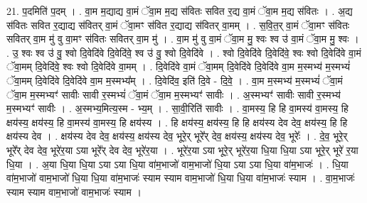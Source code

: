 \documentclass[17pt]{extarticle}
\begin{document}
21. प॒दमिति॑ प॒दम् । . वा॒म म॒द्याद्य वा॒मं ॅवा॒म म॒द्य स॑वितः सवित र॒द्य वा॒मं ॅवा॒म म॒द्य स॑वितः । . अ॒द्य स॑वितः सवित र॒द्याद्य स॑वितर् वा॒मं ॅवा॒मꣳ स॑वित र॒द्याद्य स॑वितर् वा॒मम् । . स॒वि॒त॒र् वा॒मं ॅवा॒मꣳ स॑वितः सवितर् वा॒म मु॑ वु वा॒मꣳ स॑वितः सवितर् वा॒म मु॑ । . वा॒म मु॑ वु वा॒मं ॅवा॒म मु॒ श्वः श्व उ॑ वा॒मं ॅवा॒म मु॒ श्वः । . उ॒ श्वः श्व उ॑ वु॒ श्वो दि॒वेदि॑वे दि॒वेदि॑वे॒ श्व उ॑ वु॒ श्वो दि॒वेदि॑वे । . श्वो दि॒वेदि॑वे दि॒वेदि॑वे॒ श्वः श्वो दि॒वेदि॑वे वा॒मं ॅवा॒मम् दि॒वेदि॑वे॒ श्वः श्वो दि॒वेदि॑वे वा॒मम् । . दि॒वेदि॑वे वा॒मं ॅवा॒मम् दि॒वेदि॑वे दि॒वेदि॑वे वा॒म म॒स्मभ्य॑ म॒स्मभ्यं॑ ॅवा॒मम् दि॒वेदि॑वे दि॒वेदि॑वे वा॒म म॒स्मभ्य᳚म् । . दि॒वेदि॑व॒ इति॑ दि॒वे - दि॒वे॒ । . वा॒म म॒स्मभ्य॑ म॒स्मभ्यं॑ ॅवा॒मं ॅवा॒म म॒स्मभ्यꣳ॑ सावीः सावी र॒स्मभ्यं॑ ॅवा॒मं ॅवा॒म म॒स्मभ्यꣳ॑ सावीः । . अ॒स्मभ्यꣳ॑ सावीः सावी र॒स्मभ्य॑ म॒स्मभ्यꣳ॑ सावीः । . अ॒स्मभ्य॒मित्य॒स्म - भ्य॒म् । . सा॒वी॒रिति॑ सावीः । . वा॒मस्य॒ हि हि वा॒मस्य॑ वा॒मस्य॒ हि क्षय॑स्य॒ क्षय॑स्य॒ हि वा॒मस्य॑ वा॒मस्य॒ हि क्षय॑स्य । . हि क्षय॑स्य॒ क्षय॑स्य॒ हि हि क्षय॑स्य देव देव॒ क्षय॑स्य॒ हि हि क्षय॑स्य देव । . क्षय॑स्य देव देव॒ क्षय॑स्य॒ क्षय॑स्य देव॒ भूरे॒र् भूरे᳚र् देव॒ क्षय॑स्य॒ क्षय॑स्य देव॒ भूरेः᳚ । . दे॒व॒ भूरे॒र् भूरे᳚र् देव देव॒ भूरे॑र॒या ऽया भूरे᳚र् देव देव॒ भूरे॑र॒या । . भूरे॑र॒या ऽया भूरे॒र् भूरे॑र॒या धि॒या धि॒या ऽया भूरे॒र् भूरे॑ र॒या धि॒या । . अ॒या धि॒या धि॒या ऽया ऽया धि॒या वा॑म॒भाजो॑ वाम॒भाजो॑ धि॒या ऽया ऽया धि॒या वा॑म॒भाजः॑ । . धि॒या वा॑म॒भाजो॑ वाम॒भाजो॑ धि॒या धि॒या वा॑म॒भाजः॑ स्याम स्याम वाम॒भाजो॑ धि॒या धि॒या वा॑म॒भाजः॑ स्याम । . वा॒म॒भाजः॑ स्याम स्याम वाम॒भाजो॑ वाम॒भाजः॑ स्याम । \newline
\end{document}
